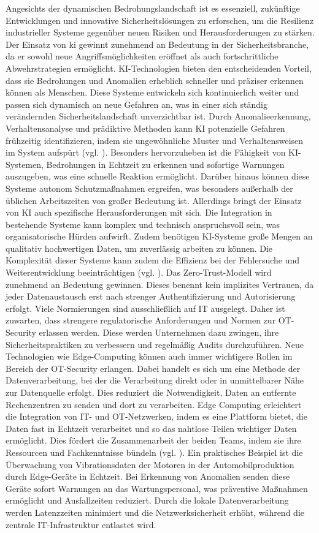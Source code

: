 Angesichts der dynamischen Bedrohungslandschaft ist es essenziell, zukünftige Entwicklungen und innovative Sicherheitslösungen zu erforschen, um die Resilienz industrieller Systeme gegenüber neuen Risiken und Herausforderungen zu stärken. Der Einsatz von \ac{ki} gewinnt zunehmend an Bedeutung in der Sicherheitsbranche, da er sowohl neue Angriffsmöglichkeiten eröffnet als auch fortschrittliche Abwehrstrategien ermöglicht. KI-Technologien bieten den entscheidenden Vorteil, dass sie Bedrohungen und Anomalien erheblich schneller und präziser erkennen können als Menschen. Diese Systeme entwickeln sich kontinuierlich weiter und passen sich dynamisch an neue Gefahren an, was in einer sich ständig verändernden Sicherheitslandschaft unverzichtbar ist. Durch Anomalieerkennung, Verhaltensanalyse und prädiktive Methoden kann KI potenzielle Gefahren frühzeitig identifizieren, indem sie ungewöhnliche Muster und Verhaltensweisen im System aufspürt (vgl. \cite{hornetsec}). Besonders hervorzuheben ist die Fähigkeit von KI-Systemen, Bedrohungen in Echtzeit zu erkennen und sofortige Warnungen auszugeben, was eine schnelle Reaktion ermöglicht. Darüber hinaus können diese Systeme autonom Schutzmaßnahmen ergreifen, was besonders außerhalb der üblichen Arbeitszeiten von großer Bedeutung ist. Allerdings bringt der Einsatz von KI auch spezifische Herausforderungen mit sich. Die Integration in bestehende Systeme kann komplex und technisch anspruchsvoll sein, was organisatorische Hürden aufwirft. Zudem benötigen KI-Systeme große Mengen an qualitativ hochwertigen Daten, um zuverlässig arbeiten zu können. Die Komplexität dieser Systeme kann zudem die Effizienz bei der Fehlersuche und Weiterentwicklung beeinträchtigen (vgl. \cite{itPort}). Das Zero-Trust-Modell wird zunehmend an Bedeutung gewinnen. Dieses benennt kein implizites Vertrauen, da jeder Datenaustausch erst nach strenger Authentifizierung und Autorisierung erfolgt. Viele Normierungen sind ausschließlich auf IT ausgelegt. Daher ist zuwarten, dass strengere regulatorische Anforderungen und Normen zur OT-Security erlassen werden. Diese werden Unternehmen dazu zwingen, ihre Sicherheitspraktiken zu verbessern und regelmäßig Audits durchzuführen. Neue Technologien wie Edge-Computing können auch immer wichtigere Rollen im Bereich der OT-Security erlangen. Dabei handelt es sich um eine Methode der Datenverarbeitung, bei der die Verarbeitung direkt oder in unmittelbarer Nähe zur Datenquelle erfolgt. Dies reduziert die Notwendigkeit, Daten an entfernte Rechenzentren zu senden und dort zu verarbeiten. Edge Computing erleichtert die Integration von IT- und OT-Netzwerken, indem es eine Plattform bietet, die Daten fast in Echtzeit verarbeitet und so das nahtlose Teilen wichtiger Daten ermöglicht. Dies fördert die Zusammenarbeit der beiden Teams, indem sie ihre Ressourcen und Fachkenntnisse bündeln (vgl. \cite{stratus}). Ein praktisches Beispiel ist die Überwachung von Vibrationsdaten der Motoren in der Automobilproduktion durch Edge-Geräte in Echtzeit. Bei Erkennung von Anomalien senden diese Geräte sofort Warnungen an das Wartungspersonal, was präventive Maßnahmen ermöglicht und Ausfallzeiten reduziert. Durch die lokale Datenverarbeitung werden Latenzzeiten minimiert und die Netzwerksicherheit erhöht, während die zentrale IT-Infrastruktur entlastet wird. 